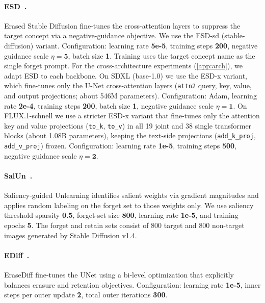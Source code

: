 \paragraph{ESD~\citep{gandikota2023erasing}.} 
Erased Stable Diffusion fine-tunes the cross-attention layers to suppress the target concept via a negative-guidance objective. We use the ESD-sd (stable-diffusion) variant. 
Configuration: learning rate \textbf{5e-5}, training steps \textbf{200}, negative guidance scale $\eta = \textbf{5}$, 
batch size \textbf{1}. Training uses the target concept name as the single forget prompt.
For the cross-architecture experiments (\cref{app:arch}), we adapt ESD to each backbone.
On SDXL (base-1.0) we use the ESD-x variant, which fine-tunes only the U-Net cross-attention layers (\texttt{attn2} query, key, value, and output projections; about 546M parameters). Configuration: Adam, learning rate \textbf{2e-4}, training steps \textbf{200}, batch size \textbf{1}, negative guidance scale $\eta = \textbf{1}$.
On FLUX.1-schnell we use a stricter ESD-x variant that fine-tunes only the attention key and value projections (\texttt{to\_k}, \texttt{to\_v}) in all 19 joint and 38 single transformer blocks (about 1.08B parameters), keeping the text-side projections (\texttt{add\_k\_proj}, \texttt{add\_v\_proj}) frozen. Configuration: learning rate \textbf{1e-5}, training steps \textbf{500}, negative guidance scale $\eta = \textbf{2}$.

\paragraph{SalUn~\citep{fan2023salun}.} 
Saliency-guided Unlearning identifies salient weights via gradient magnitudes and applies random labeling on the forget set to those weights only. We use saliency threshold sparsity \textbf{0.5}, forget-set size \textbf{800}, learning rate \textbf{1e-5}, and training epochs \textbf{5}. The forget and retain sets consist of 800 target and 800 non-target images generated by Stable Diffusion v1.4.
\paragraph{EDiff~\citep{wu2024erasediff}.} 
EraseDiff fine-tunes the UNet using a bi-level optimization that explicitly balances erasure and retention objectives. Configuration: learning rate \textbf{1e-5}, inner steps per outer update \textbf{2}, total outer iterations \textbf{300}.
